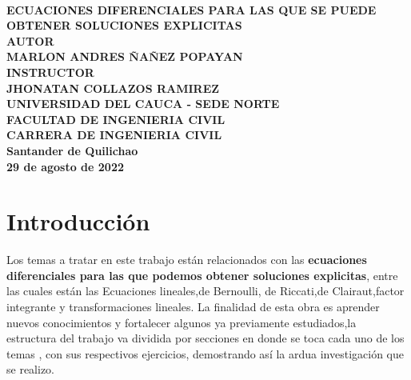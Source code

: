 \documentclass[10pt,a4paper]{article}
\author{Marlon Ñañez}
\begin{document}

  \begin{center}
\,\\
  \vspace{33cm}
    {\Large\textbf{ECUACIONES DIFERENCIALES PARA LAS QUE SE PUEDE OBTENER SOLUCIONES EXPLICITAS}}\\
   \vspace{8cm}
   {\Large\textbf{AUTOR}}\\
   \vspace{0.8cm}
 {\Large\textbf{MARLON ANDRES ÑAÑEZ POPAYAN}}\\
   \vspace{0.8cm}
   {\Large\textbf{INSTRUCTOR}}\\
   \vspace{0.8cm}
 {\Large\textbf{JHONATAN COLLAZOS RAMIREZ}}\\
   \vspace{7cm}
   {\Large\textbf{UNIVERSIDAD DEL CAUCA - SEDE NORTE}}\\
   \vspace{0.8cm}
 {\Large\textbf{FACULTAD DE INGENIERIA CIVIL}}\\
   \vspace{0.8cm}
   {\Large\textbf{CARRERA DE INGENIERIA CIVIL}}\\
   \vspace{0.8cm}
 {\Large\textbf{Santander de Quilichao}}\\
   \vspace{0.8cm}
   {\Large\textbf{29 de agosto de 2022}}\\

  \end{center}
\tableofcontents
\vspace{23cm}

\section{Introducción}
Los temas a tratar en este trabajo están relacionados con las \textbf{ecuaciones diferenciales para las que podemos obtener soluciones explicitas}, entre las cuales están las Ecuaciones lineales,de Bernoulli, de Riccati,de Clairaut,factor integrante y transformaciones lineales. La finalidad de esta obra es aprender nuevos conocimientos y fortalecer algunos ya previamente estudiados,la estructura del trabajo va dividida por secciones en donde se toca cada uno de los temas , con sus respectivos ejercicios, demostrando así la ardua investigación que se realizo.
\end{document}
